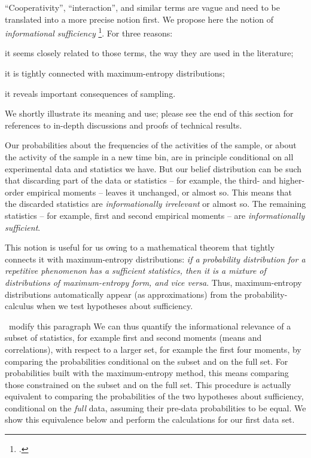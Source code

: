 \documentclass[\ifafour a4paper,12pt,\else a5paper,10pt,\fi%
onecolumn,oneside,article,%
british%
]{memoir}
\theoremstyle{remark}
\theoremstyle{innote}
\newcommand*{\citep}{\footcites}
\renewcommand*{\|}{\nonscript\,\vert\nonscript\;\mathopen{}}
\newcommand*{\sect}{\S}%
\newcommand*{\chap}{ch.}%
\newcommand*{\puzzle}{{\fontencoding{U}\fontfamily{fontawesometwo}\selectfont\symbol{225}}}
\newcommand{\mynote}[1]{ {\color{notecolour}\puzzle\ #1}}
\begin{document}
\bigskip

\enquote{Cooperativity}, \enquote{interaction}, and similar terms are vague
and need to be translated into a more precise notion first. We propose here
the notion of \emph{informational sufficiency}
\citep{kullbacketal1951}[\sect~4.5]{bernardoetal1994}[\chap~8 and
\sect~14.2]{jaynes1994_r2003}. For three reasons:
\begin{enumerate*}[label=(\roman*)]
\item it seems closely related to those terms, the way they are used in the
  literature; \item it is tightly connected with maximum-entropy
  distributions; \item it reveals important consequences of sampling.
\end{enumerate*}
We shortly illustrate its meaning and use; please see the end of this
section for references to in-depth discussions and proofs of technical
results.

Our probabilities about the frequencies of the activities of the sample, or
about the activity of the sample in a new time bin, are in principle
conditional on all experimental data and statistics we have. But our belief
distribution can be such that discarding part of the data or statistics --
for example, the third- and higher-order empirical moments -- leaves it
unchanged, or almost so. This means that the discarded statistics are
\emph{informationally irrelevant} or almost so. The remaining statistics --
for example, first and second empirical moments -- are
\emph{informationally sufficient}.

This notion is useful for us owing to a mathematical theorem that tightly
connects it with maximum-entropy distributions: \emph{if a probability
  distribution for a repetitive phenomenon has a sufficient statistics,
  then it is a mixture of distributions of maximum-entropy form, and vice
  versa}. Thus, maximum-entropy distributions automatically appear (as
approximations) from the probability-calculus when we test hypotheses about
sufficiency.

\mynote{modify this paragraph }We can thus quantify the informational
relevance of a subset of statistics, for example first and second moments
(means and correlations), with respect to a larger set, for example the
first four moments, by comparing the probabilities conditional on the
subset and on the full set. For probabilities built with the
maximum-entropy method, this means comparing those constrained on the
subset and on the full set. This procedure is actually equivalent to
comparing the probabilities of the two hypotheses about sufficiency,
conditional on the \emph{full} data, assuming their pre-data probabilities
to be equal. We show this equivalence below and perform the calculations
for our first data set. \medskip
\end{document}
